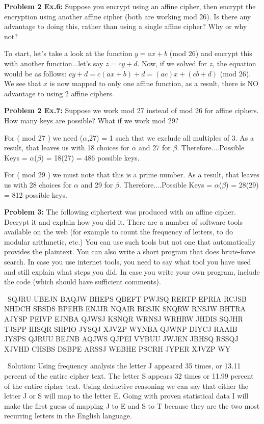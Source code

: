 \documentclass[12pt,letterpaper,final]{report}
\begin{document}
\bigskip
\noindent\textbf{Problem 2 Ex.6:} Suppose you encrypt using an affine cipher, then encrypt the encryption using another affine cipher (both are working mod 26). Is there any advantage to doing this, rather than using a single affine cipher? Why or why not?

\bigskip
\indent\indent To start, let's take a look at the function $y = ax + b$ (mod 26) and encrypt this with another function...let's say $z = cy + d$.  Now, if we solved for $z$, the equation would be as follows: $cy + d = c(ax + b) + d = (ac)x + (cb + d)$ (mod 26). We see that $x$ is now mapped to only one affine function, as a result, there is NO advantage to using 2 affine ciphers. 

\bigskip

\noindent\textbf{Problem 2 Ex.7:} Suppose we work mod 27 instead of mod 26 for affine ciphers. How many keys are possible? What if we work mod 29?

\bigskip\indent\indent For ( mod 27 ) we need ($\alpha$,27) = 1 such that we exclude all multiples of 3. As a result, that leaves us with 18 choices for $\alpha$ and 27 for $\beta$. Therefore....Possible Keys =  $\alpha$($\beta$) = 18(27) = 486 possible keys.

\bigskip\indent\indent For ( mod 29 ) we must note that this is a prime number. As a result, that leaves us with 28 choices for $\alpha$ and 29 for $\beta$. Therefore....Possible Keys =  $\alpha$($\beta$) = 28(29) = 812 possible keys.




\bigskip

\noindent\textbf{Problem 3:} The following ciphertext was produced with an affine cipher. Decrypt it and explain how you did it. There are a number of software tools available on the web (for example to count the frequency of letters, to do modular arithmetic, etc.) You can use such tools but not one that automatically provides the plaintext.  You can also write a short program that does brute-force search. In case you use internet tools, you need to say what tool you have used and still explain what steps you did. In case you write your own program, include the code (which should have sufficient comments).

\bigskip
\indent\ SQJRU UBEJN BAQJW BHEPS QBEFT PWJSQ RERTP EPRIA RCJSB NHDCH SBSDS BPEHB ENJJR NQAIR BESJK SNQRW RNSJW BHTRA AJYSP PEIVP EJNBA QJWSJ KSNQR WRNSJ WRHRW JHDIS SQJHR TJSPP IHSQR SHPIO JYSQJ XJVZP WYNBA QJWNP DIYCJ RAAIB JYSPS QJRUU BEJNB AQJWS QJPEI VYBUU JWJEN JBHSQ RSSQJ XJVHD CHSBS DSBPE ARSSJ WEBHE PSCRH JYPER XJVZP WY

\indent\ Solution: Using frequency analysis the letter J appeared 35 times, or 13.11 percent of the entire cipher text. The letter S appears 32 times or 11.99 percent of the entire cipher text. Using deductive reasoning we can say that either the letter J or S will map to the letter E. Going with proven statistical data I will make the first guess of mapping J to E and S to T because they are the two most recurring letters in the English language. 
\end{document}
